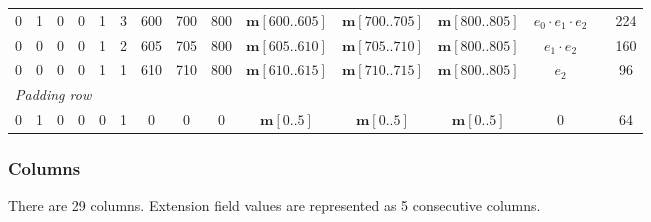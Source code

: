 \documentclass{article}
\theoremstyle{definition}
\begin{document}
{\begin{tabular}{ccccccccccccccc}
0 & 1 & 0 & 0 & 1 & 3 & 600 & 700 & 800 & $\textbf{m}[600..605]$ & $\textbf{m}[700..705]$ & $\textbf{m}[800..805]$ & $e_0 \cdot e_1 \cdot e_2$ & & 224 \\
0 & 0 & 0 & 0 & 1 & 2 & 605 & 705 & 800 & $\textbf{m}[605..610]$ & $\textbf{m}[705..710]$ & $\textbf{m}[800..805]$ & $e_1 \cdot e_2$           & & 160 \\
0 & 0 & 0 & 0 & 1 & 1 & 610 & 710 & 800 & $\textbf{m}[610..615]$ & $\textbf{m}[710..715]$ & $\textbf{m}[800..805]$ & $e_2$                     & & 96 \\
\midrule
\multicolumn{15}{l}{\textit{Padding row}} \\[2pt]
0 & 1 & 0 & 0 & 0 & 1 & 0   & 0   & 0   & $\textbf{m}[0..5]$ & $\textbf{m}[0..5]$ & $\textbf{m}[0..5]$ & 0 & & 64 \\
\bottomrule
\end{tabular}%
}

\subsubsection{Columns}

There are 29 columns. Extension field values are represented as 5 consecutive columns.

\vspace{2mm}
\end{document}
